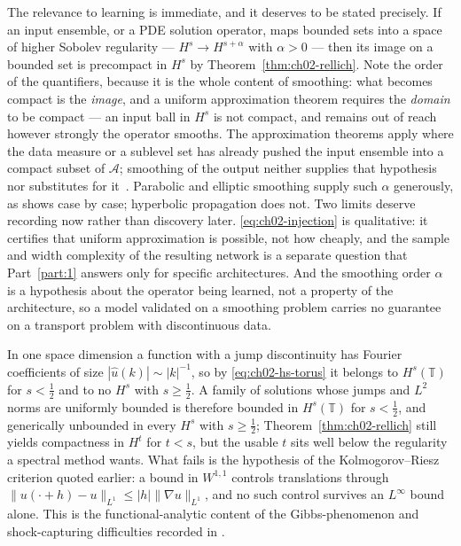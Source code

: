 The relevance to learning is immediate, and it deserves to be stated precisely. If an input ensemble, or a PDE solution operator, maps bounded sets into a space of higher Sobolev regularity --- $H^s \to H^{s+\alpha}$ with $\alpha > 0$ --- then its image on a bounded set is precompact in $H^s$ by Theorem~\ref{thm:ch02-rellich}. Note the order of the quantifiers, because it is the whole content of smoothing: what becomes compact is the \emph{image}, and a uniform approximation theorem requires the \emph{domain} to be compact --- an input ball in $H^s$ is not compact, and remains out of reach however strongly the operator smooths. The approximation theorems apply where the data measure or a sublevel set has already pushed the input ensemble into a compact subset of $\mathcal{A}$; smoothing of the output neither supplies that hypothesis nor substitutes for it~\cite{kovachki2023neural}. Parabolic and elliptic smoothing supply such $\alpha$ generously, as  shows case by case; hyperbolic propagation does not. Two limits deserve recording now rather than discovery later. \eqref{eq:ch02-injection} is qualitative: it certifies that uniform approximation is possible, not how cheaply, and the sample and width complexity of the resulting network is a separate question that Part~\ref{part:1} answers only for specific architectures. And the smoothing order $\alpha$ is a hypothesis about the operator being learned, not a property of the architecture, so a model validated on a smoothing problem carries no guarantee on a transport problem with discontinuous data.

\begin{remark}
\label{rem:ch02-jumps}
In one space dimension a function with a jump discontinuity has Fourier coefficients of size $|\hat{u}(k)| \sim |k|^{-1}$, so by \eqref{eq:ch02-hs-torus} it belongs to $H^s(\mathbb{T})$ for $s < \tfrac{1}{2}$ and to no $H^s$ with $s \ge \tfrac{1}{2}$. A family of solutions whose jumps and $L^2$ norms are uniformly bounded is therefore bounded in $H^s(\mathbb{T})$ for $s < \tfrac{1}{2}$, and generically unbounded in every $H^s$ with $s \ge \tfrac{1}{2}$; Theorem~\ref{thm:ch02-rellich} still yields compactness in $H^t$ for $t < s$, but the usable $t$ sits well below the regularity a spectral method wants. What fails is the hypothesis of the Kolmogorov--Riesz criterion quoted earlier: a bound in $W^{1,1}$ controls translations through $\|u(\cdot+h)-u\|_{L^1} \le |h| \|\nabla u\|_{L^1}$, and no such control survives an $L^\infty$ bound alone. This is the functional-analytic content of the Gibbs-phenomenon and shock-capturing difficulties recorded in .
\end{remark}

